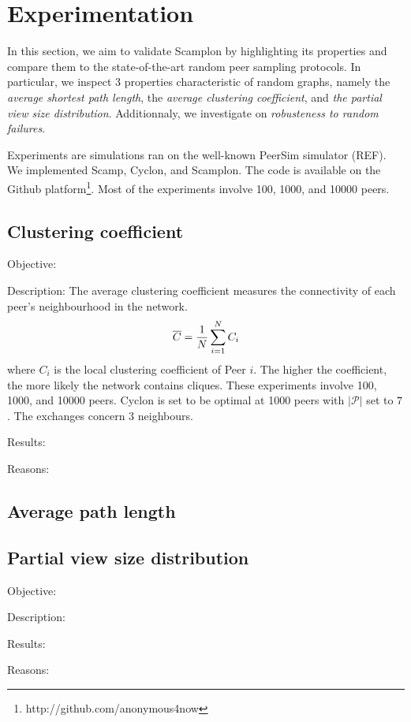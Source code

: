 
\section{Experimentation}
\label{sec:experiments}
In this section, we aim to validate Scamplon by highlighting its properties and
compare them to the state-of-the-art random peer sampling protocols. In
particular, we inspect 3 properties characteristic of random graphs, namely the
\emph{average shortest path length}, the \emph{average clustering coefficient},
and \emph{the partial view size distribution}. Additionnaly, we investigate on
\emph{robusteness to random failures}.

Experiments are simulations ran on the well-known PeerSim simulator (REF). We
implemented Scamp, Cyclon, and Scamplon. The code is available on the Github
platform\footnote{http://github.com/anonymous4now}. Most of the experiments
involve 100, 1000, and 10000 peers.

\subsection{Clustering coefficient}
\begin{asparadesc}
\item[Objective:]
\item[Description:] The average clustering coefficient measures the
  connectivity of each peer's neighbourhood in the network.
  \begin{equation}
    \overline{C} = {1\over N}\sum\limits_{i=1}^{N}C_i
    \end{equation}
    where $C_i$ is the local clustering coefficient of Peer $i$. The higher the
    coefficient, the more likely the network contains cliques. These
    experiments involve 100, 1000, and 10000 peers. Cyclon is set to be optimal
    at 1000 peers with $|\mathcal{P}|$ set to $7$. The exchanges concern $3$
    neighbours.
\item[Results:]
\item[Reasons:]
\end{asparadesc}

\subsection{Average path length}


\subsection{Partial view size distribution}
\begin{asparadesc}
\item[Objective:]
\item[Description:]
\item[Results:]
\item[Reasons:]
\end{asparadesc}

